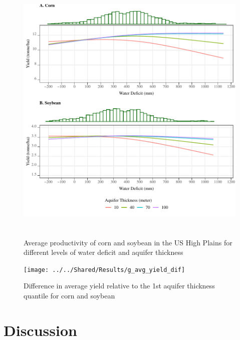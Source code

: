 \documentclass[
]{article}
\begin{document}
\begin{figure}[H]

{\centering \includegraphics[width=6in,height=500px,]{Figures/g_total_impact} 

}

\caption{Average productivity of corn and soybean in the US High Plains for different levels of water deficit and aquifer thickness}\label{fig:tot-impact}
\end{figure}

\begin{figure}[H]

{\centering \texttt{[image: ../../Shared/Results/g\_avg\_yield\_dif]} 

}

\caption{Difference in average yield relative to the 1st aquifer thickness quantile for corn and soybean}\label{fig:dif-tot-impact}
\end{figure}

\clearpage

\hypertarget{discussion}{%
\section{Discussion}\label{discussion}}
\end{document}
